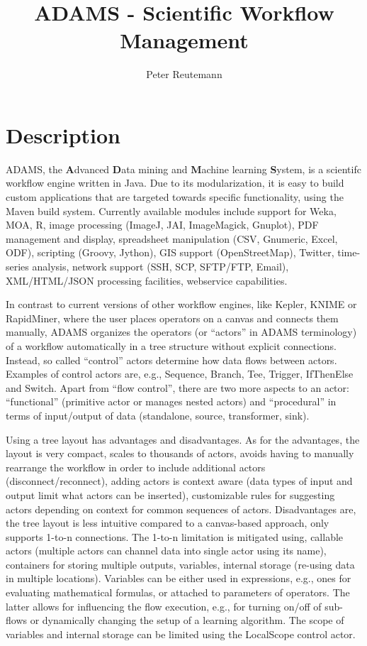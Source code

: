 \documentclass[a4paper,10pt]{article}
\title{ADAMS - Scientific Workflow Management}
\author{Peter Reutemann}
\begin{document}
\maketitle

\section{Description}
ADAMS, the \textbf{A}dvanced \textbf{D}ata mining and \textbf{M}achine learning \textbf{S}ystem, is a scientifc workflow engine written in Java. Due to its modularization, it is easy to build custom applications that are targeted towards specific functionality, using the Maven build system. Currently available modules include support for Weka, MOA, R, image processing (ImageJ, JAI, ImageMagick, Gnuplot), PDF management and display, spreadsheet manipulation (CSV, Gnumeric, Excel, ODF), scripting (Groovy, Jython), GIS support (OpenStreetMap), Twitter, time-series analysis, network support (SSH, SCP, SFTP/FTP, Email), XML/HTML/JSON processing facilities, webservice capabilities.

In contrast to current versions of other workflow engines, like Kepler, KNIME or RapidMiner, where the user places operators on a canvas and connects them manually, ADAMS organizes the operators (or ``actors'' in ADAMS terminology) of a workflow automatically in a tree structure without explicit connections. Instead, so called ``control'' actors determine how data flows between actors. Examples of control actors are, e.g., Sequence, Branch, Tee, Trigger, IfThenElse and Switch. Apart from ``flow control'', there are two more aspects to an actor: ``functional'' (primitive actor or manages nested actors) and ``procedural'' in terms of input/output of data (standalone, source, transformer, sink).

Using a tree layout has advantages and disadvantages. As for the advantages, the layout is very compact, scales to thousands of actors, avoids having to manually rearrange the workflow in order to include additional actors (disconnect/reconnect), adding actors is context aware (data types of input and output limit what actors can be inserted), customizable rules for suggesting actors depending on context for common sequences of actors. Disadvantages are, the tree layout is less intuitive compared to a canvas-based approach, only supports 1-to-n connections. The 1-to-n limitation is mitigated using, callable actors (multiple actors can channel data into single actor using its name), containers for storing multiple outputs, variables, internal storage (re-using data in multiple locations). Variables can be either used in expressions, e.g., ones for evaluating mathematical formulas, or attached to parameters of operators. The latter allows for influencing the flow execution, e.g., for turning on/off of sub-flows or dynamically changing the setup of a learning algorithm. The scope of variables and internal storage can be limited using the LocalScope control actor.
\end{document}
